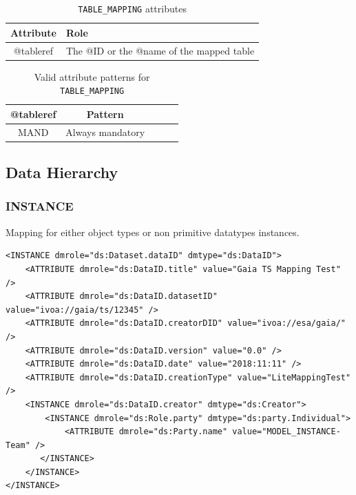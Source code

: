 \documentclass[11pt,a4paper]{ivoa}
\begin{document}
\begin{table}[!htbp]
\small
\centering
\begin{tabulary}{\linewidth}{|c|J|}       
       \hline 
            \textbf{Attribute} & 
            \textbf {Role}\\
       \hline         \hline  
            @tableref  & 
            The @ID or the @name of the mapped table  \\
       \hline 
     \end{tabulary}
     \caption{\texttt{TABLE\_MAPPING} attributes} 
     \label{tbl:templ-att}
 \end{table}

\begin{table}[!htbp]
\small
\centering
\begin{tabulary}{\linewidth}{|c|c|c|c|J|}
    \hline 
        \textbf{@tableref} &
        \textbf{Pattern}\\
    \hline      \hline  
        MAND &   
        Always mandatory\\
   \hline 
\end{tabulary}
     \caption{Valid attribute patterns for  \texttt{TABLE\_MAPPING}} 
     \label{tbl:templ-pattern}
 \end{table}
\FloatBarrier

%
%
\subsection{Data Hierarchy}

%
%

\subsubsection{INSTANCE}

Mapping for either object types or non primitive datatypes instances.

\begin{lstlisting}[caption={INSTANCE block example},style=XML]
<INSTANCE dmrole="ds:Dataset.dataID" dmtype="ds:DataID">
    <ATTRIBUTE dmrole="ds:DataID.title" value="Gaia TS Mapping Test" />
    <ATTRIBUTE dmrole="ds:DataID.datasetID" value="ivoa://gaia/ts/12345" />
    <ATTRIBUTE dmrole="ds:DataID.creatorDID" value="ivoa://esa/gaia/" />
    <ATTRIBUTE dmrole="ds:DataID.version" value="0.0" />
    <ATTRIBUTE dmrole="ds:DataID.date" value="2018:11:11" />
    <ATTRIBUTE dmrole="ds:DataID.creationType" value="LiteMappingTest" />
    <INSTANCE dmrole="ds:DataID.creator" dmtype="ds:Creator">
        <INSTANCE dmrole="ds:Role.party" dmtype="ds:party.Individual">
            <ATTRIBUTE dmrole="ds:Party.name" value="MODEL_INSTANCE-Team" />
       </INSTANCE>
    </INSTANCE>
</INSTANCE>
\end{lstlisting}
\end{document}
